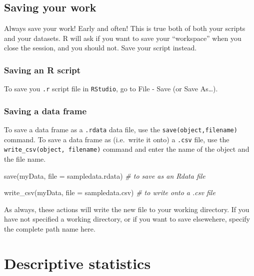 \documentclass[
  12pt,
]{krantz}
\newenvironment{Shaded}{\begin{snugshade}}{\end{snugshade}}
\newcommand{\AttributeTok}[1]{\textcolor[rgb]{0.77,0.63,0.00}{#1}}
\newcommand{\CommentTok}[1]{\textcolor[rgb]{0.56,0.35,0.01}{\textit{#1}}}
\newcommand{\FunctionTok}[1]{\textcolor[rgb]{0.00,0.00,0.00}{#1}}
\newcommand{\NormalTok}[1]{#1}
\newcommand{\StringTok}[1]{\textcolor[rgb]{0.31,0.60,0.02}{#1}}
\begin{document}
\hypertarget{saving-your-work}{%
\section{Saving your work}\label{saving-your-work}}

Always save your work! Early and often! This is true both of both your scripts and your datasets. R will ask if you want to save your ``workspace'' when you close the session, and you should not. Save your script instead.

\hypertarget{saving-an-r-script}{%
\subsection{Saving an R script}\label{saving-an-r-script}}

To save you \texttt{.r} script file in \texttt{RStudio}, go to File - Save (or Save As\ldots).

\hypertarget{saving-a-data-frame}{%
\subsection{Saving a data frame}\label{saving-a-data-frame}}

To save a data frame as a \texttt{.rdata} data file, use the \texttt{save(object,\textquotesingle{}filename\textquotesingle{})} command. To save a data frame as (i.e.~write it onto) a \texttt{.csv} file, use the \texttt{write\_csv(object,\ \textquotesingle{}filename\textquotesingle{})} command and enter the name of the object and the file name.

\begin{Shaded}
\begin{Highlighting}[]
  \FunctionTok{save}\NormalTok{(myData, }\AttributeTok{file =} \StringTok{\textquotesingle{}sampledata.rdata\textquotesingle{}}\NormalTok{)      }\CommentTok{\# to save as an Rdata file}

  \FunctionTok{write\_csv}\NormalTok{(myData, }\AttributeTok{file =} \StringTok{\textquotesingle{}sampledata.csv\textquotesingle{}}\NormalTok{)   }\CommentTok{\# to write onto a .csv file}
\end{Highlighting}
\end{Shaded}

As always, these actions will write the new file to your working directory. If you have not specified a working directory, or if you want to save elsewehere, specify the complete path name here.

\hypertarget{descriptive-statistics}{%
\chapter{Descriptive statistics}\label{descriptive-statistics}}
\end{document}

